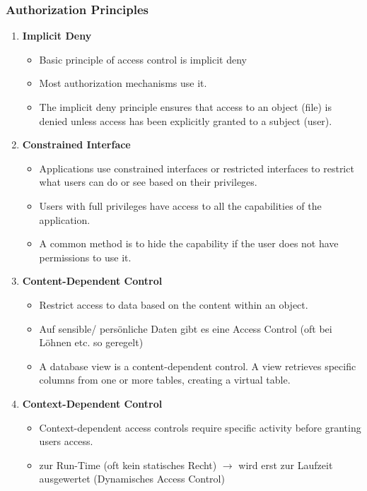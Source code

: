 \newpage

\subsubsection{Authorization Principles}
\begin{enumerate}
    \item \textbf{Implicit Deny}
    \begin{itemize}
        \item Basic principle of access control is implicit deny
        \item Most authorization mechanisms use it.
        \item The implicit deny principle ensures that access to an object (file) is denied unless access has been explicitly granted to a subject (user).
    \end{itemize}
    \item \textbf{Constrained Interface}
    \begin{itemize}
        \item Applications use constrained interfaces or restricted interfaces to restrict what users can do or see based on their privileges.
        \item Users with full privileges have access to all the capabilities of the application.
        \item A common method is to hide the capability if the user does not have permissions to use it.
    \end{itemize}
    \item \textbf{Content-Dependent Control}
    \begin{itemize}
        \item Restrict access to data based on the content within an object.
        \item Auf sensible/ persönliche Daten gibt es eine Access Control (oft bei Löhnen etc. so geregelt)
        \item A database view is a content-dependent control. A view retrieves specific columns from one or more tables, creating a virtual table.
    \end{itemize}
    \item \textbf{Context-Dependent Control}
    \begin{itemize}
        \item Context-dependent access controls require specific activity before granting users access.
        \item zur Run-Time (oft kein statisches Recht) $\rightarrow$ wird erst zur Laufzeit ausgewertet (Dynamisches Access Control)

\end{itemize}
\end{enumerate}
